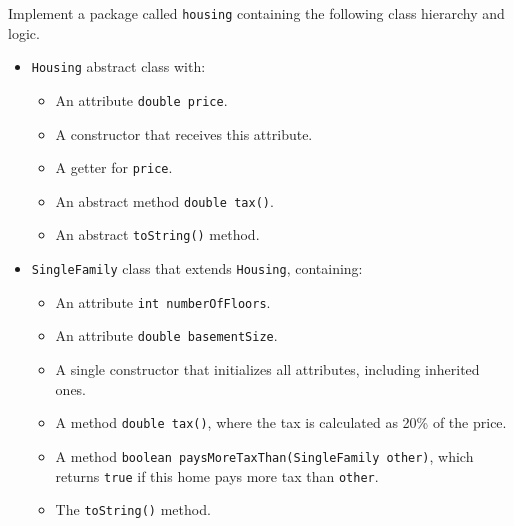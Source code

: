 Implement a package called \texttt{housing} containing the following class hierarchy and logic.

\begin{itemize}

    \item \texttt{Housing} abstract class with:

        \begin{itemize}

            \item An attribute \texttt{double price}.

            \item A constructor that receives this attribute.

            \item A getter for \texttt{price}.

            \item An abstract method \texttt{double tax()}.

            \item An abstract \texttt{toString()} method.

        \end{itemize}

    \item \texttt{SingleFamily} class that extends \texttt{Housing}, containing:

        \begin{itemize}

            \item An attribute \texttt{int numberOfFloors}.

            \item An attribute \texttt{double basementSize}.

            \item A single constructor that initializes all attributes, including inherited ones.

            \item A method \texttt{double tax()}, where the tax is calculated as 20\% of the price.

            \item A method \texttt{boolean paysMoreTaxThan(SingleFamily other)}, which returns \texttt{true} if this home pays more tax than \texttt{other}.

            \item The \texttt{toString()} method.

        \end{itemize}


\end{itemize}
